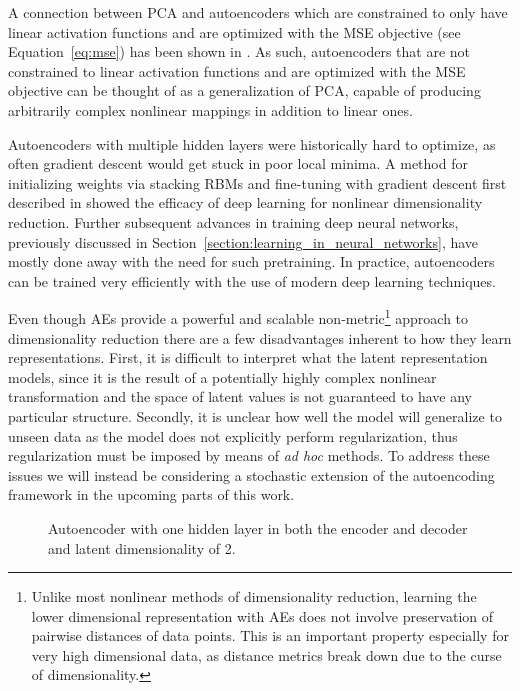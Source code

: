 A connection between PCA and autoencoders which are constrained to only have linear activation functions and are optimized with the MSE objective (see Equation~\ref{eq:mse}) has been shown in \cite{autoencoder_pca}. As such, autoencoders that are not constrained to linear activation functions and are optimized with the MSE objective can be thought of as a generalization of PCA, capable of producing arbitrarily complex nonlinear mappings in addition to linear ones.

Autoencoders with multiple hidden layers were historically hard to optimize, as often gradient descent would get stuck in poor local minima. A method for initializing weights via stacking RBMs and fine-tuning with gradient descent first described in \cite{hinton_autoencoder} showed the efficacy of deep learning for nonlinear dimensionality reduction. Further subsequent advances in training deep neural networks, previously discussed in Section~\ref{section:learning_in_neural_networks}, have mostly done away with the need for such pretraining. In practice, autoencoders can be trained very efficiently with the use of modern deep learning techniques.

Even though AEs provide a powerful and scalable non-metric\footnote{Unlike most nonlinear methods of dimensionality reduction, learning the lower dimensional representation with AEs does not involve preservation of pairwise distances of data points. This is an important property especially for very high dimensional data, as distance metrics break down due to the curse of dimensionality.} approach to dimensionality reduction there are a few disadvantages inherent to how they learn representations. First, it is difficult to interpret what the latent representation models, since it is the result of a potentially highly complex nonlinear transformation and the space of latent values is not guaranteed to have any particular structure. Secondly, it is unclear how well the model will generalize to unseen data as the model does not explicitly perform regularization, thus regularization must be imposed by means of \textit{ad hoc} methods. To address these issues we will instead be considering a stochastic extension of the autoencoding framework in the upcoming parts of this work.

\begin{figure}[!htb]
  \centering
  \resizebox{0.8\textwidth}{!}{\unskip}
  \caption{Autoencoder with one hidden layer in both the encoder and decoder and latent dimensionality of 2.}
  \label{fig:ae}
\end{figure}

